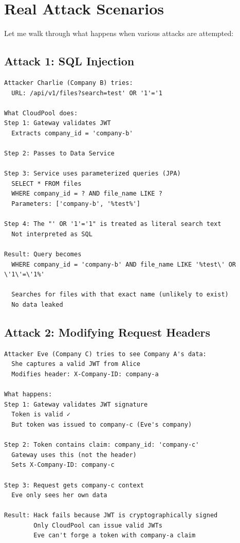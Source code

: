 \documentclass[11pt,a4paper]{report}
\begin{document}
\chapter{Real Attack Scenarios}


Let me walk through what happens when various attacks are attempted:


\section{Attack 1: SQL Injection}


\begin{lstlisting}[language=text]
Attacker Charlie (Company B) tries:
  URL: /api/v1/files?search=test' OR '1'='1

What CloudPool does:
Step 1: Gateway validates JWT
  Extracts company_id = 'company-b'

Step 2: Passes to Data Service

Step 3: Service uses parameterized queries (JPA)
  SELECT * FROM files 
  WHERE company_id = ? AND file_name LIKE ?
  Parameters: ['company-b', '%test%']

Step 4: The "' OR '1'='1" is treated as literal search text
  Not interpreted as SQL

Result: Query becomes
  WHERE company_id = 'company-b' AND file_name LIKE '%test\' OR \'1\'=\'1%'
  
  Searches for files with that exact name (unlikely to exist)
  No data leaked
\end{lstlisting}


\section{Attack 2: Modifying Request Headers}


\begin{lstlisting}[language=text]
Attacker Eve (Company C) tries to see Company A's data:
  She captures a valid JWT from Alice
  Modifies header: X-Company-ID: company-a

What happens:
Step 1: Gateway validates JWT signature
  Token is valid ✓
  But token was issued to company-c (Eve's company)
  
Step 2: Token contains claim: company_id: 'company-c'
  Gateway uses this (not the header)
  Sets X-Company-ID: company-c

Step 3: Request gets company-c context
  Eve only sees her own data

Result: Hack fails because JWT is cryptographically signed
        Only CloudPool can issue valid JWTs
        Eve can't forge a token with company-a claim
\end{lstlisting}
\end{document}
